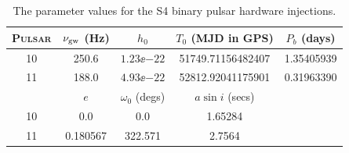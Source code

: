 \begin{table}[!htbp]
\caption{\label{S4BinInjectionParams} The parameter values for the S4 binary pulsar hardware
injections.}
\begin{center}
\begin{tabular}{c | c c c c}
P\textsc{ulsar} & $\nu_{\rm gw}$ (Hz) & $h_0$ & $T_0$ (MJD in GPS) & $P_b$ (days) \\
\hline
\footnotesize{10} & \footnotesize{250.6} & \footnotesize{$1.23\ee{-22}$} &
\footnotesize{51749.71156482407} & \footnotesize{1.35405939} \\
\footnotesize{11} & \footnotesize{188.0} & \footnotesize{$4.93\ee{-22}$} &
\footnotesize{52812.92041175901} & \footnotesize{0.31963390} \\
\hline
 & $e$ & $\omega_0$ (degs) & $a\sin{i}$ (secs) \\
\hline
\footnotesize{10} & \footnotesize{0.0} & \footnotesize{0.0} & \footnotesize{1.65284} \\
\footnotesize{11} & \footnotesize{0.180567} & \footnotesize{322.571} & \footnotesize{2.7564} \\
\end{tabular}
\end{center}
\end{table}


